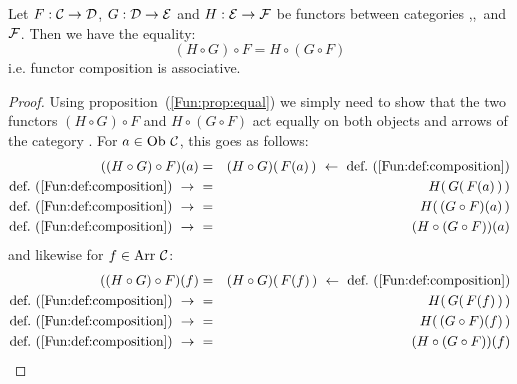 \begin{prop}\label{Fun:prop:associative}
    Let $F:\mbox{$\cal C$}\to\mbox{$\cal D$}$, $G:\mbox{$\cal D$}\to\mbox{$\cal E$}$ and $H:\mbox{$\cal E$}\to{\cal F}$ be functors
    between categories \Cat,\Dat,\Eat\ and $\cal F$. Then we have the equality:
        \[
            (H\circ G)\circ F = H\circ (G\circ F)
        \]
    i.e. functor composition is associative.
\end{prop}
\begin{proof}
    Using proposition~(\ref{Fun:prop:equal}) we simply need to show that
    the two functors $(H\circ G)\circ F$ and $H\circ (G\circ F)$ act equally 
    on both objects and arrows of the category \Cat. For $a\in\mbox{\rm Ob}\ \mbox{$\cal C$}$, 
    this goes as follows:
        \begin{eqnarray*}((H\circ G)\circ F)(a)
            &=&(H\circ G)(\,F(a)\,)\ \leftarrow\ 
            \mbox{def.~(\ref{Fun:def:composition})}\\
            \mbox{def.~(\ref{Fun:def:composition})}\ \to\ 
            &=&H(\,G(\,F(a)\,)\,)\\
            \mbox{def.~(\ref{Fun:def:composition})}\ \to\ 
            &=&H(\,(G\circ F)(a)\,)\\
            \mbox{def.~(\ref{Fun:def:composition})}\ \to\ 
            &=&(H\circ (G\circ F))(a)
        \end{eqnarray*}
    and likewise for $f\in\mbox{\rm Arr}\ \mbox{$\cal C$}$:
        \begin{eqnarray*}((H\circ G)\circ F)(f)
            &=&(H\circ G)(\,F(f)\,)\ \leftarrow\ 
            \mbox{def.~(\ref{Fun:def:composition})}\\
            \mbox{def.~(\ref{Fun:def:composition})}\ \to\ 
            &=&H(\,G(\,F(f)\,)\,)\\
            \mbox{def.~(\ref{Fun:def:composition})}\ \to\ 
            &=&H(\,(G\circ F)(f)\,)\\
            \mbox{def.~(\ref{Fun:def:composition})}\ \to\ 
            &=&(H\circ (G\circ F))(f)
        \end{eqnarray*}
\end{proof}
